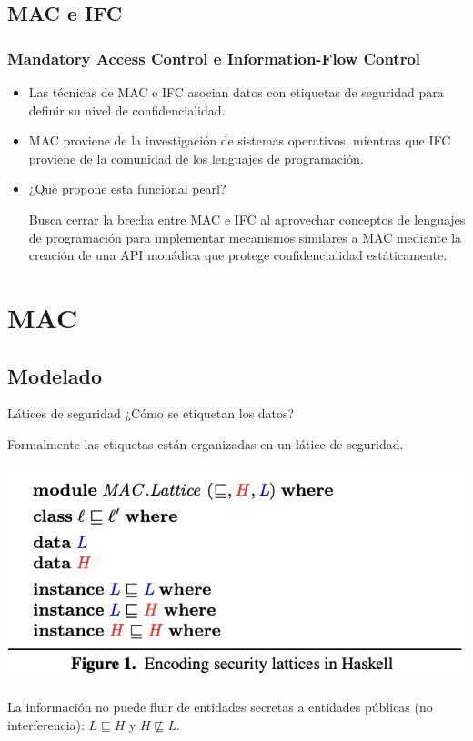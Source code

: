 \documentclass{beamer}
\begin{document}
\subsection{MAC e IFC}

\begin{frame}
    \frametitle{Mandatory Access Control e Information-Flow Control}
    \begin{itemize}
        \item<1-> Las técnicas de MAC e IFC asocian datos con etiquetas de seguridad para definir su nivel de confidencialidad.
        \item<1-> MAC proviene de la investigación de sistemas operativos, mientras que IFC proviene de la comunidad de los lenguajes de programación.
        \item<1-> ¿Qué propone esta funcional pearl? 
        
        Busca cerrar la brecha entre MAC e IFC al aprovechar conceptos de lenguajes de programación para implementar mecanismos similares a MAC mediante la creación de una API monádica que protege confidencialidad estáticamente.
    \end{itemize}
\end{frame}

\section{\textbf{MAC}}

\subsection{Modelado}

\begin{frame}{Látices de seguridad}
    ¿Cómo se etiquetan los datos?
    
    Formalmente las etiquetas están organizadas en un látice de seguridad.

    \begin{center}
        \includegraphics[scale=0.8]{figure1.png}
    \end{center}

    La información no puede fluir de entidades secretas a entidades públicas (no interferencia): $L \sqsubseteq H$ y $H \not\sqsubseteq L$.

\end{frame}
\end{document}
